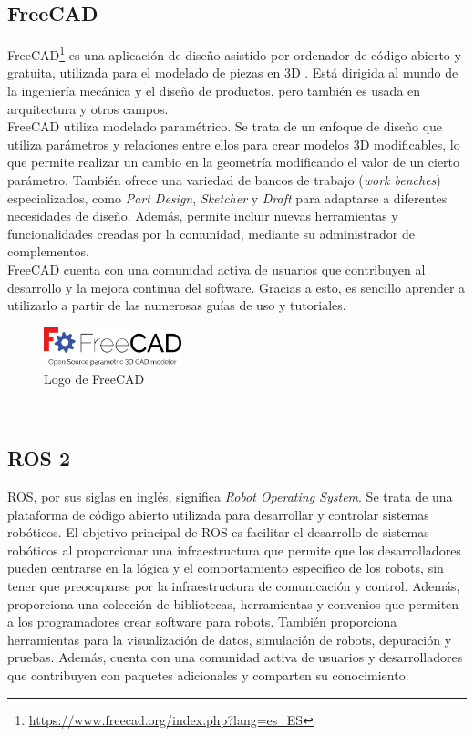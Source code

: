 \subsection{FreeCAD}
\label{subsec:freecad}
FreeCAD\footnote{\url{https://www.freecad.org/index.php?lang=es_ES}} es una aplicación de diseño asistido por ordenador de código abierto y gratuita, utilizada para el modelado de piezas en 3D .
Está dirigida al mundo de la ingeniería mecánica y el diseño de productos, pero también es usada en arquitectura y otros campos.
\\FreeCAD utiliza modelado paramétrico. Se trata de un enfoque de diseño que utiliza parámetros y relaciones entre ellos para 
crear modelos 3D modificables, lo que permite realizar un cambio en la geometría modificando el valor de un cierto parámetro.
También ofrece una variedad de bancos de trabajo (\textit{work benches}) especializados, como \textit{Part Design}, \textit{Sketcher} y \textit{Draft} para adaptarse a diferentes 
necesidades de diseño. Además, permite incluir nuevas herramientas y funcionalidades creadas por la comunidad, mediante su administrador 
de complementos.
\\FreeCAD cuenta con una comunidad activa de usuarios que contribuyen al desarrollo y la mejora continua del software. Gracias a esto, 
es sencillo aprender a utilizarlo a partir de las numerosas guías de uso y tutoriales.
\begin{figure} [h!]
  \begin{center}
    \includegraphics[width=4cm]{figs/freecad.png}
  \end{center}
  \caption{Logo de FreeCAD}
  \label{fig:freecadlogo}
\end{figure}\ 

\subsection{ROS 2}
\label{subsec:ros2}
ROS, por sus siglas en inglés, significa \textit{Robot Operating System}. Se trata de una plataforma de código abierto utilizada 
para desarrollar y controlar sistemas robóticos.
El objetivo principal de ROS es facilitar el desarrollo de sistemas robóticos al proporcionar una infraestructura que permite que
los desarrolladores pueden centrarse en la lógica y el comportamiento específico de los robots, sin tener que preocuparse por la 
infraestructura de comunicación y control. 
Además, proporciona una colección de bibliotecas, herramientas y convenios que permiten a los programadores crear software para robots. 
También proporciona herramientas para la visualización de datos, simulación de robots, depuración y pruebas. Además, 
cuenta con una comunidad activa de usuarios y desarrolladores que contribuyen con paquetes adicionales y comparten su 
conocimiento.

